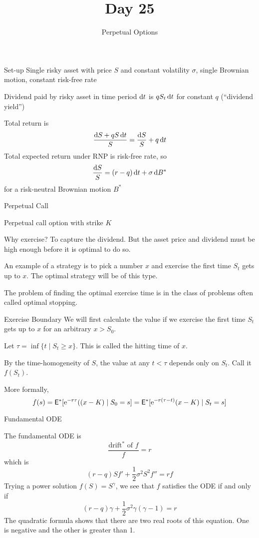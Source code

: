 \documentclass[xcolor=dvipsnames,10pt]{beamer}
\begin{document}
\title{\vskip 0.5in Day 25}
\subtitle{Perpetual Options}

\begin{frame}
  \titlepage
\end{frame}

\begin{frame}{Set-up}
   Single risky asset with price $S$ and constant volatility $\sigma$, single Brownian motion, constant risk-free rate
   
   Dividend paid by risky asset in time period $\mathrm{d} t$ is $qS_t\,\mathrm{d} t$ for constant $q$ (``dividend yield'')
   
   Total return is
   $$\frac{\mathrm{d} S + qS\,\mathrm{d} t}{S} = \frac{\mathrm{d} S}{S} + q\,\mathrm{d} t$$
   Total expected return under RNP is risk-free rate, so
   $$\frac{\mathrm{d} S}{S} = (r-q)\,\mathrm{d} t + \sigma\,\mathrm{d} B^*$$
   for a risk-neutral Brownian motion $B^*$
\end{frame}

\begin{frame}{Perpetual Call}

Perpetual call option with strike $K$

Why exercise?  To capture the dividend.  But the asset price and dividend must be high enough before it is optimal to do so.

An example of a strategy is to pick a number $x$ and exercise the first time $S_t$ gets up to $x$.  The optimal strategy will be of this type.

The problem of finding the optimal exercise time is in the class of problems often called optimal stopping.
\end{frame}

\begin{frame}{Exercise Boundary}
We will first calculate the value if we exercise the first time $S_t$ gets up to $x$ for an arbitrary $x>S_0$.

Let $\tau = \inf\{t \mid S_t \ge x\}$.  This is called the hitting time of $x$.

By the time-homogeneity of $S$, the value at any $t<\tau$ depends only on $S_t$.  Call it $f(S_t)$.  
    
    More formally,
    $$f(s) = \mathsf{E}^*[\mathrm{e}^{-r\tau}((x-K) \mid S_0=s] = \mathsf{E}^*[\mathrm{e}^{-r(\tau-t)} (x-K)\mid S_t=s]$$
\end{frame}
\begin{frame}{Fundamental ODE}
    
    The fundamental ODE is 
    $$\frac{\text{drift$^*$ of $f$}}{f} = r$$
    which is
    $$(r-q)Sf' + \frac{1}{2}\sigma^2S^2f'' = rf$$
    Trying a power solution $f(S) = S^\gamma$, we see that $f$ satisfies the ODE if and only if
    $$(r-q)\gamma + \frac{1}{2}\sigma^2\gamma(\gamma-1) = r$$
    The quadratic formula shows that there are two real roots of this equation.  One is negative and the other is greater than 1.  
    

\end{frame}
    
\end{document}
